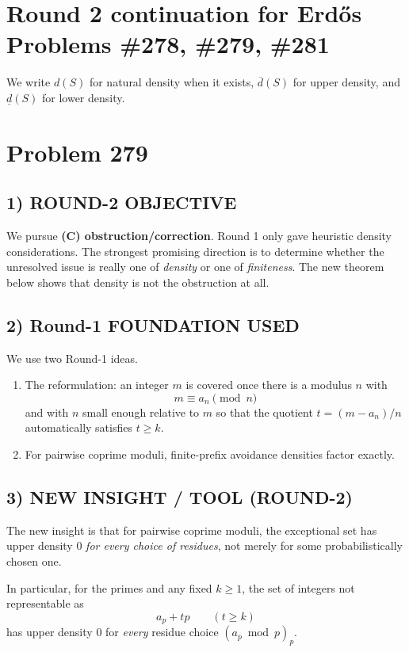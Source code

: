
\section*{Round 2 continuation for Erd\H{o}s Problems \#278, \#279, \#281}

We write $d(S)$ for natural density when it exists, $\overline d(S)$ for upper density, and $\underline d(S)$ for lower density.

\section*{Problem 279}

\subsection*{1) ROUND-2 OBJECTIVE}

We pursue \textbf{(C) obstruction/correction}. Round 1 only gave heuristic density considerations. The strongest promising direction is to determine whether the unresolved issue is really one of \emph{density} or one of \emph{finiteness}. The new theorem below shows that density is not the obstruction at all.

\subsection*{2) Round-1 FOUNDATION USED}

We use two Round-1 ideas.

\begin{enumerate}
\item The reformulation: an integer $m$ is covered once there is a modulus $n$ with
\[
m\equiv a_n\pmod n
\]
and with $n$ small enough relative to $m$ so that the quotient $t=(m-a_n)/n$ automatically satisfies $t\ge k$.
\item For pairwise coprime moduli, finite-prefix avoidance densities factor exactly.
\end{enumerate}

\subsection*{3) NEW INSIGHT / TOOL (ROUND-2)}

The new insight is that for pairwise coprime moduli, the exceptional set has upper density $0$ \emph{for every choice of residues}, not merely for some probabilistically chosen one.

In particular, for the primes and any fixed $k\ge 1$, the set of integers not representable as
\[
a_p+t p \qquad (t\ge k)
\]
has upper density $0$ for \emph{every} residue choice $(a_p \bmod p)_p$.

